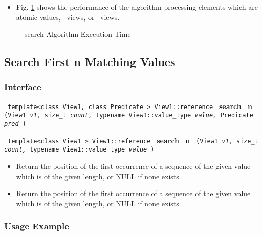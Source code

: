 \begin{itemize}
\item
Fig. \ref{fig:search-alg-exec-exper}
shows the performance of the algorithm processing
elements which are atomic values, \stl\ views, or \stapl\ views.
\end{itemize}

\begin{figure}[p]
\caption{search Algorithm Execution Time}
\label{fig:search-alg-exec-exper}
\end{figure}

 
\subsection{Search First n Matching Values} \label{sec-srch-search_n}

\subsubsection{Interface} %

\noindent
\texttt{%
template<class View1, class Predicate >
\newline
View1::reference 
}
\newline
\textbf{search\_n}%
\texttt{%
(View1 
\textit{v1,}%
size\_t 
\textit{count,}%
typename View1::value\_type 
\textit{value,}%
Predicate 
\textit{pred}%
)
}
\vspace{0.4cm}

\noindent
\texttt{%
template<class View1 >
\newline
View1::reference 
}
\newline
\textbf{search\_n}%
\texttt{%
(View1 
\textit{v1,}%
size\_t 
\textit{count,}%
typename View1::value\_type 
\textit{value}%
)
}

\begin{itemize}
\item
Return the position of the first occurrence of a sequence of the given value which is of the given length, or NULL if none exists. 
\item
Return the position of the first occurrence of a sequence of the given value which is of the given length, or NULL if none exists. 
\end{itemize}

\subsubsection{Usage Example} %

